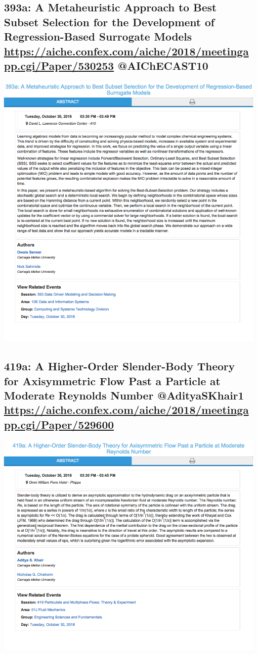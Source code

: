 \documentclass[11pt]{article}
\begin{document}
\subsection{393a: A Metaheuristic Approach to Best Subset Selection for the Development of Regression-Based Surrogate Models \url{https://aiche.confex.com/aiche/2018/meetingapp.cgi/Paper/530253} @AIChECAST10}
\label{sec:org2e4281e}
\begin{center}
\includegraphics[width=.9\linewidth]{./530253.png}
\end{center}
\subsection{419a: A Higher-Order Slender-Body Theory for Axisymmetric Flow Past a Particle at Moderate Reynolds Number @AdityaSKhair1 \url{https://aiche.confex.com/aiche/2018/meetingapp.cgi/Paper/529600}}
\label{sec:org95dc07a}
\begin{center}
\includegraphics[width=.9\linewidth]{./529600.png}
\end{center}
\end{document}
